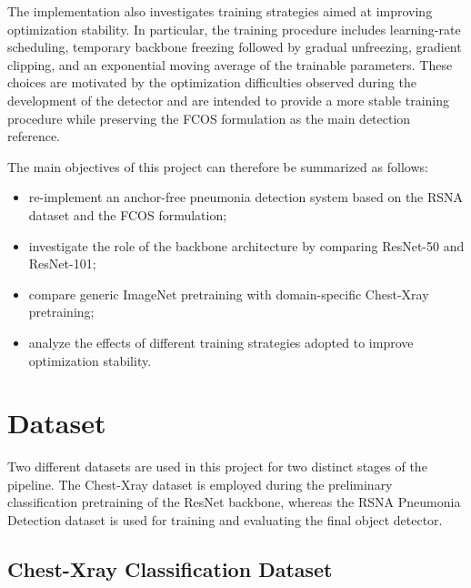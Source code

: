 \documentclass[11pt,a4paper]{article}
\begin{document}
The implementation also investigates training strategies aimed at improving optimization stability. 
In particular, the training procedure includes learning-rate scheduling, temporary backbone freezing followed by gradual unfreezing, gradient clipping, and an exponential moving average of the trainable parameters. 
These choices are motivated by the optimization difficulties observed during the development of the detector and are intended to provide a more stable training procedure while preserving the FCOS formulation as the main detection reference.

The main objectives of this project can therefore be summarized as follows:

\begin{itemize}
    \item re-implement an anchor-free pneumonia detection system based on the RSNA dataset and the FCOS formulation;
    \item investigate the role of the backbone architecture by comparing ResNet-50 and ResNet-101;
    \item compare generic ImageNet pretraining with domain-specific Chest-Xray pretraining;
    \item analyze the effects of different training strategies adopted to improve optimization stability.
\end{itemize}








\section{Dataset}
\label{sec:dataset}

Two different datasets are used in this project for two distinct stages of the
pipeline. The Chest-Xray dataset is employed during the preliminary
classification pretraining of the ResNet backbone, whereas the RSNA Pneumonia
Detection dataset is used for training and evaluating the final object
detector.

\subsection{Chest-Xray Classification Dataset}
\label{subsec:chest_xray_dataset}
\end{document}
